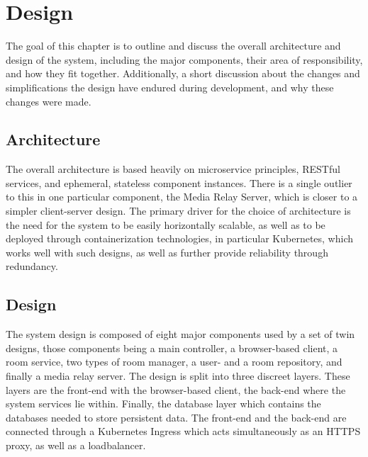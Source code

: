 \chapter{Design}

The goal of this chapter is to outline and discuss the overall architecture and design of the system, including the major components, their area of responsibility, and how they fit together. Additionally, a short discussion about the changes and simplifications the design have endured during development, and why these changes were made.

\section{Architecture}

The overall architecture is based heavily on microservice principles, RESTful services, and ephemeral, stateless component instances. There is a single outlier to this in one particular component, the Media Relay Server, which is closer to a simpler client-server design. The primary driver for the choice of architecture is the need for the system to be easily horizontally scalable, as well as to be deployed through containerization technologies, in particular Kubernetes, which works well with such designs, as well as further provide reliability through redundancy.

\section{Design}

The system design is composed of eight major components used by a set of twin designs, those components being a main controller, a browser-based client, a room service, two types of room manager, a user- and a room repository, and finally a media relay server. The design is split into three discreet layers. These layers are the front-end with the browser-based client, the back-end where the system services lie within. Finally, the database layer which contains the databases needed to store persistent data. The front-end and the back-end are connected through a Kubernetes Ingress which acts simultaneously as an HTTPS proxy, as well as a loadbalancer.

